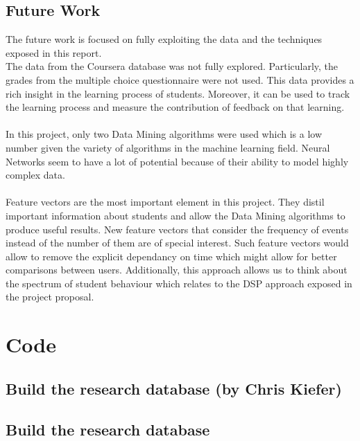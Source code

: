 \documentclass[11pt, oneside]{article}   	%
\begin{document}
\subsection{Future Work}
The future work is focused on fully exploiting the data and the techniques exposed in this report.\\
The data from the Coursera database was not fully explored. Particularly, the grades from the multiple choice questionnaire were not used. This data provides a rich insight in the learning process of students. Moreover, it can be used to track the learning process and measure the contribution of feedback on that learning.\\\\
In this project, only two Data Mining algorithms were used which is a low number given the variety of algorithms in the machine learning field. Neural Networks seem to have a lot of potential because of their ability to model highly complex data.\\\\
Feature vectors are the most important element in this project. They distil important information about students and allow the Data Mining algorithms to produce useful results. New feature vectors that consider the frequency of events instead of the number of them are of special interest. Such feature vectors would allow to remove the explicit dependancy on time which might allow for better comparisons between users. Additionally, this approach allows us to think about the spectrum of student behaviour which relates to the DSP approach exposed in the project proposal.





\newpage
\appendix

\section{Code}
\subsection{Build the research database (by Chris Kiefer)}
	
	\label{importScript}
\subsection{Build the research database}
	
	\label{importShard1}
\end{document}
